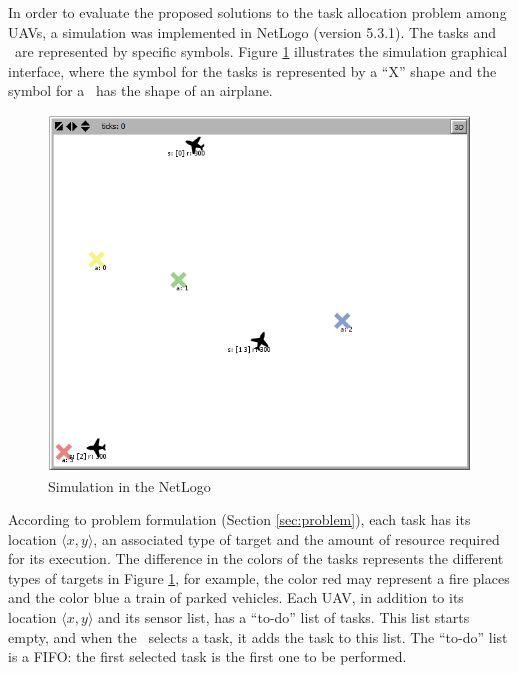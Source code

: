 In order to evaluate the proposed solutions to the task allocation problem among UAVs, a simulation was implemented in NetLogo\citep{tisue2004netlogo} (version 5.3.1). The tasks and \uavs\ are represented by specific symbols.
Figure \ref{fig:simulacao} illustrates the simulation graphical interface, where the symbol for the tasks is represented by a ``X'' shape and the symbol for a \uav\ has the shape of an airplane.

\begin{figure}[h!]
	\begin{center}
		\includegraphics[scale=0.50]{simulation.png}
		\caption{Simulation in the NetLogo}
		\label{fig:simulacao}
	\end{center}
\end{figure}

According to problem formulation (Section \ref{sec:problem}), each task has its location $\langle x,y \rangle$, an associated type of target and the amount of resource required for its execution. The difference in the colors of the tasks represents the different types of targets in Figure \ref{fig:simulacao}, for example, the color red may represent a fire places and the color blue a train of parked vehicles. Each UAV, in addition to its location $\langle x,y \rangle$ and its sensor list, has a ``to-do'' list of tasks. This list starts empty, and when the \uav\ selects a task, it adds the task to this list. 
The ``to-do'' list is a FIFO: the first selected task is the first one to be performed.

